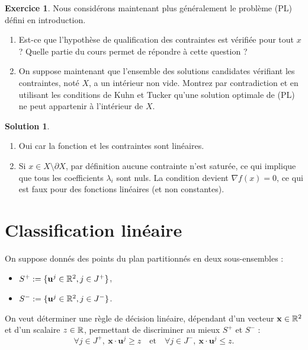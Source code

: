 \documentclass[a4paper,francais]{article}
\newcommand{\R}{{\ensuremath\mathbb{R}}}
\theoremstyle{definition}
\newtheorem{exercice}{Exercice}[section]
\newtheorem*{solution}{Solution}
\begin{document}
\begin{exercice}
  Nous considérons maintenant plus généralement le problème (PL) défini
  en introduction. 
  \begin{enumerate}
  \item Est-ce que l'hypothèse de qualification des contraintes est vérifiée
    pour tout $x$ ? Quelle partie du cours permet de répondre à cette question ?
  \item On suppose maintenant que l'ensemble des solutions candidates vérifiant
    les contraintes, noté $X$, a un intérieur non vide. Montrez par contradiction et en utilisant les conditions de Kuhn et Tucker qu'une solution optimale de (PL) ne peut appartenir à l'intérieur de $X$.
  \end{enumerate}
\end{exercice}

\begin{solution}
  \begin{enumerate}
  \item Oui car la fonction et les contraintes sont linéaires.
  \item Si $x \in X \setminus \partial X$, par définition aucune contrainte n'est saturée,
  ce qui implique que tous les coefficients $\lambda_i$ sont nuls. La condition
  devient ${\nabla f}(x) = 0$, ce qui est faux pour des fonctions linéaires (et non
  constantes).
  \end{enumerate}
\end{solution}

\section{Classification linéaire}
\label{sec:classif}

\let\vec\mathbf

On suppose donnés des points du plan partitionnés en deux sous-ensembles :
\begin{itemize}
\item $S^+ := \{ \vec{u}^j \in \R^2, j \in J^+ \}$,
\item $S^- := \{ \vec{u}^j \in \R^2, j \in J^- \}$.
\end{itemize}
On veut déterminer une règle de décision linéaire, dépendant d'un vecteur $\vec{x} \in \R^2$
et d'un scalaire $z \in \R$, permettant de discriminer au mieux $S^+$ et $S^-$ :
\begin{equation}
  \label{eq:regle}
\forall j \in J^+, \ \vec{x} \cdot \vec{u}^j \geq z
\quad \text{et} \quad
\forall j \in J^-, \ \vec{x} \cdot \vec{u}^j \leq z.
\end{equation}
\end{document}
